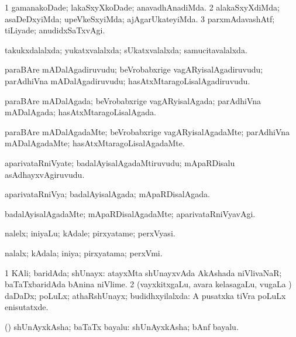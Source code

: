 \bentry
{}
\gl{\kirxvi}
\bmng
\bnum
\num{1} gamanakoDade; lakaSxyXkoDade; anavadhAnadiMda. 
\num{2} alakaSxyXdiMda; asaDeDxyiMda; upeVkeSxyiMda; ajAgarUkateyiMda. 
\num{3} parxmAdavashAtf; tiLiyade; anudidxSaTxvAgi. 
\enum
\emng
\eentry

\bentry
{}
\gl{\gu}
\bmng
takukxdalalxda; yukatxvalalxda; sUkatxvalalxda; samucitavalalxda. 
\emng
\eentry

\bentry
{}
\gl{\nA}
\bmng
paraBAre mADalAgadiruvudu; beVrobabxrige vagARyisalAgadiruvudu; parAdhiVna mADalAgadiruvudu; hasAtxMtaragoLisalAgadiruvudu. 
\emng
\eentry

\bentry
{}
\gl{\gu}
\bmng
paraBAre mADalAgada; beVrobabxrige vagARyisalAgada; parAdhiVna mADalAgada; hasAtxMtaragoLisalAgada. 
\emng
\eentry

\bentry
{}
\gl{\kirxvi}
\bmng
paraBAre mADalAgadaMte; beVrobabxrige vagARyisalAgadaMte; parAdhiVna mADalAgadaMte; hasAtxMtaragoLisalAgadaMte. 
\emng
\eentry

\bentry
{}
\gl{\nA}
\bmng
aparivataRniVyate; badalAyisalAgadaMtiruvudu; mApaRDisalu asAdhayxvAgiruvudu. 
\emng
\eentry

\bentry
{}
\gl{\gu}
\bmng
aparivataRniVya; badalAyisalAgada; mApaRDisalAgada. 
\emng
\eentry

\bentry
{}
\gl{\kirxvi}
\bmng
badalAyisalAgadaMte; mApaRDisalAgadaMte; aparivataRniVyavAgi. 
\emng
\eentry

\bentry
{}
\gl{\nA}
\bmng
nalelx; iniyaLu; kAdale; pirxyatame; perxVyasi. 
\emng
\eentry

\bentry
{}
\gl{\nA}
\bmng
nalalx; kAdala; iniya; pirxyatama; perxVmi. 
\emng
\eentry

\bentry
{}
\gl{\gu}
\bmng
\bnum
\num{1} KAli; baridAda; shUnayx:  atayxMta shUnayxvAda AkAshada niVlivaNaR; baTaTxbaridAda bAnina niVlime. 
\num{2} (vayxkitxgaLu, avara kelasagaLu, \mo vugaLa \vi) daDaDx; poLuLx; athaRshUnayx; budidhxyilalxda:  A pusatxka tiVra poLuLx enisutatxde. 
\enum
\emng
\eentry

\bentry
{}
\gl{\nA}
\bmng
(\pArxparx) shUnAyxkAsha; baTaTx bayalu:  shUnAyxkAsha; bAnf bayalu. 
\emng
\eentry

